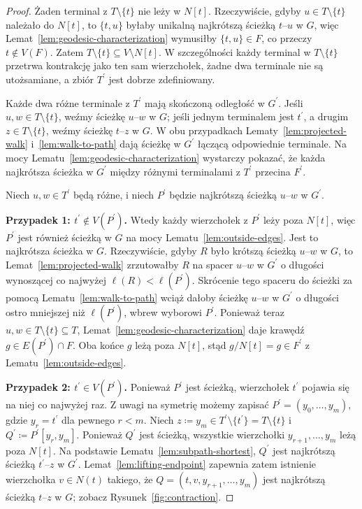 \documentclass[11pt,a4paper]{amsart}
\theoremstyle{definition}
\theoremstyle{plain}
\newcommand{\len}[1]{\ell(#1)}
\begin{document}
\begin{proof}
Żaden terminal z $T\setminus\{t\}$ nie leży w $N[t]$. Rzeczywiście, gdyby $u\in T\setminus\{t\}$ należało do $N[t]$, to $\{t,u\}$ byłaby unikalną najkrótszą ścieżką $t$--$u$ w $G$, więc Lemat~\ref{lem:geodesic-characterization} wymusiłby $\{t,u\}\in F$, co przeczy $t\notin V(F)$. Zatem $T\setminus\{t\}\subseteq V\setminus N[t]$. W szczególności każdy terminal w $T\setminus\{t\}$ przetrwa kontrakcję jako ten sam wierzchołek, żadne dwa terminale nie są utożsamiane, a zbiór $T^\prime$ jest dobrze zdefiniowany.

Każde dwa różne terminale z $T^\prime$ mają skończoną odległość w $G^\prime$. Jeśli $u,w\in T\setminus\{t\}$, weźmy ścieżkę $u$--$w$ w $G$; jeśli jednym terminalem jest $t^\prime$, a drugim $z\in T\setminus\{t\}$, weźmy ścieżkę $t$--$z$ w $G$. W obu przypadkach Lematy~\ref{lem:projected-walk} i~\ref{lem:walk-to-path} dają ścieżkę w $G^\prime$ łączącą odpowiednie terminale. Na mocy Lematu~\ref{lem:geodesic-characterization} wystarczy pokazać, że każda najkrótsza ścieżka w $G^\prime$ między różnymi terminalami z $T^\prime$ przecina $F^\prime$.

Niech $u,w\in T^\prime$ będą różne, i niech $P^\prime$ będzie najkrótszą ścieżką $u$--$w$ w $G^\prime$.

\smallskip\noindent
\textbf{Przypadek 1: $t^\prime\notin V(P^\prime)$.}
Wtedy każdy wierzchołek z $P^\prime$ leży poza $N[t]$, więc $P^\prime$ jest również ścieżką w $G$ na mocy Lematu~\ref{lem:outside-edges}. Jest to najkrótsza ścieżka w $G$. Rzeczywiście, gdyby $R$ było krótszą ścieżką $u$--$w$ w $G$, to Lemat~\ref{lem:projected-walk} zrzutowałby $R$ na spacer $u$--$w$ w $G^\prime$ o długości wynoszącej co najwyżej $\len{R}<\len{P^\prime}$. Skrócenie tego spaceru do ścieżki za pomocą Lematu~\ref{lem:walk-to-path} wciąż dałoby ścieżkę $u$--$w$ w $G^\prime$ o długości ostro mniejszej niż $\len{P^\prime}$, wbrew wyborowi $P^\prime$. Ponieważ teraz $u,w\in T\setminus\{t\}\subseteq T$, Lemat~\ref{lem:geodesic-characterization} daje krawędź $g\in E(P^\prime)\cap F$. Oba końce $g$ leżą poza $N[t]$, stąd $g/N[t]=g\in F^\prime$ z Lematu~\ref{lem:outside-edges}.

\smallskip\noindent
\textbf{Przypadek 2: $t^\prime\in V(P^\prime)$.}
Ponieważ $P^\prime$ jest ścieżką, wierzchołek $t^\prime$ pojawia się na niej co najwyżej raz. Z uwagi na symetrię możemy zapisać $P^\prime=(y_0,\dots,y_m)$, gdzie $y_r=t^\prime$ dla pewnego $r<m$. Niech $z\coloneqq y_m\in T^\prime\setminus\{t^\prime\}=T\setminus\{t\}$ i $Q^\prime\coloneqq P^\prime[y_r,y_m]$. Ponieważ $Q^\prime$ jest ścieżką, wszystkie wierzchołki $y_{r+1},\dots,y_m$ leżą poza $N[t]$. Na podstawie Lematu~\ref{lem:subpath-shortest}, $Q^\prime$ jest najkrótszą ścieżką $t^\prime$--$z$ w $G^\prime$. Lemat~\ref{lem:lifting-endpoint} zapewnia zatem istnienie wierzchołka $v\in N(t)$ takiego, że $Q=(t,v,y_{r+1},\dots,y_m)$ jest najkrótszą ścieżką $t$--$z$ w $G$; zobacz Rysunek~\ref{fig:contraction}.


\end{proof}
\end{document}
